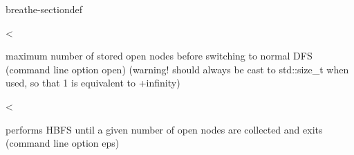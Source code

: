 \documentclass[letterpaper,10pt,openany,oneside,english]{sphinxmanual}
\begin{document}
\begin{fulllineitems}
\begin{sphinxuseclass}{breathe-sectiondef}
\begin{fulllineitems}
\end{fulllineitems}


\begin{fulllineitems}
\label{\detokenize{ref/ref_cpp:_CPPv4N8ToulBar23epsE}}\label{\detokenize{ref/ref_cpp:_CPPv3N8ToulBar23epsE}}\label{\detokenize{ref/ref_cpp:_CPPv2N8ToulBar23epsE}}\label{\detokenize{ref/ref_cpp:ToulBar2::eps__Long}}
\pysigstartsignatures
\pysigstartmultiline
{}
\pysigstopmultiline
\pysigstopsignatures
\sphinxAtStartPar
\textless{} 

\sphinxAtStartPar
maximum number of stored open nodes before switching to normal DFS (command line option \sphinxhyphen{}open) (warning! should always be cast to std::size\_t when used, so that \sphinxhyphen{}1 is equivalent to +infinity) 

\end{fulllineitems}


\begin{fulllineitems}
\label{\detokenize{ref/ref_cpp:_CPPv4N8ToulBar211epsFilenameE}}\label{\detokenize{ref/ref_cpp:_CPPv3N8ToulBar211epsFilenameE}}\label{\detokenize{ref/ref_cpp:_CPPv2N8ToulBar211epsFilenameE}}\label{\detokenize{ref/ref_cpp:ToulBar2::epsFilename__string}}
\pysigstartsignatures
\pysigstartmultiline
{}
\pysigstopmultiline
\pysigstopsignatures
\sphinxAtStartPar
\textless{} 

\sphinxAtStartPar
performs HBFS until a given number of open nodes are collected and exits (command line option \sphinxhyphen{}eps) 

\end{fulllineitems}



\end{sphinxuseclass}
\end{fulllineitems}
\end{document}
